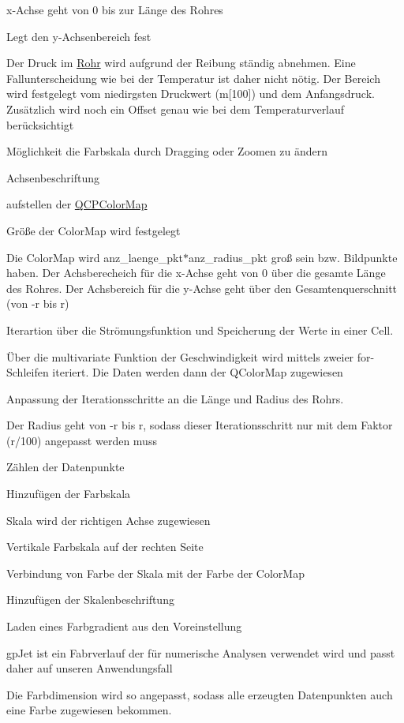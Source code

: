 x-\/\+Achse geht von 0 bis zur Länge des Rohres

Legt den y-\/\+Achsenbereich fest

Der Druck im \hyperlink{class_rohr}{Rohr} wird aufgrund der Reibung ständig abnehmen. Eine Fallunterscheidung wie bei der Temperatur ist daher nicht nötig. Der Bereich wird festgelegt vom niedirgsten Druckwert (m\mbox{[}100\mbox{]}) und dem Anfangsdruck. Zusätzlich wird noch ein Offset genau wie bei dem Temperaturverlauf berücksichtigt

Möglichkeit die Farbskala durch Dragging oder Zoomen zu ändern

Achsenbeschriftung

aufstellen der \hyperlink{class_q_c_p_color_map}{Q\+C\+P\+Color\+Map}

Größe der Color\+Map wird festgelegt

Die Color\+Map wird anz\+\_\+laenge\+\_\+pkt$\ast$anz\+\_\+radius\+\_\+pkt groß sein bzw. Bildpunkte haben. Der Achsberecheich für die x-\/\+Achse geht von 0 über die gesamte Länge des Rohres. Der Achsbereich für die y-\/\+Achse geht über den Gesamtenquerschnitt (von -\/r bis r)

Iterartion über die Strömungsfunktion und Speicherung der Werte in einer Cell.

Über die multivariate Funktion der Geschwindigkeit wird mittels zweier for-\/\+Schleifen iteriert. Die Daten werden dann der Q\+Color\+Map zugewiesen

Anpassung der Iterationsschritte an die Länge und Radius des Rohrs.

Der Radius geht von -\/r bis r, sodass dieser Iterationsschritt nur mit dem Faktor (r/100) angepasst werden muss

Zählen der Datenpunkte

Hinzufügen der Farbskala

Skala wird der richtigen Achse zugewiesen

Vertikale Farbskala auf der rechten Seite

Verbindung von Farbe der Skala mit der Farbe der Color\+Map

Hinzufügen der Skalenbeschriftung

Laden eines Farbgradient aus den Voreinstellung

gp\+Jet ist ein Fabrverlauf der für numerische Analysen verwendet wird und passt daher auf unseren Anwendungsfall

Die Farbdimension wird so angepasst, sodass alle erzeugten Datenpunkten auch eine Farbe zugewiesen bekommen.

